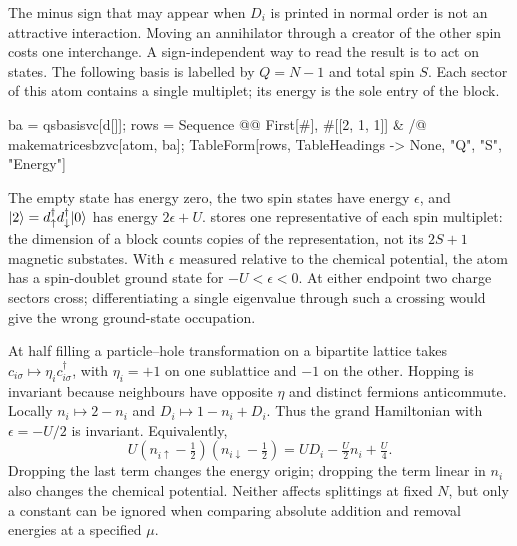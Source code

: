 The minus sign that may appear when $D_i$ is printed in normal order is
not an attractive interaction. Moving an annihilator through a creator
of the other spin costs one interchange. A sign-independent way to read
the result is to act on states. The following basis is labelled by
$Q=N-1$ and total spin $S$. Each sector of this atom contains a single
multiplet; its energy is the sole entry of the block.
\begin{wl}
ba = qsbasisvc[{d[]}];
rows = {Sequence @@ First[#], #[[2, 1, 1]]} & /@ makematricesbzvc[atom, ba];
TableForm[rows, TableHeadings -> {None, {"Q", "S", "Energy"}}]
\end{wl}

The empty state has energy zero, the two spin states have energy
$\epsilon$, and $\lvert 2\rangle=d^\dagger_\uparrow d^\dagger_\downarrow\lvert 0\rangle$
has energy $2\epsilon+U$.  stores one representative of
each spin multiplet: the dimension of a block counts copies of the
representation, not its $2S+1$ magnetic substates.
With $\epsilon$ measured relative to the chemical potential, the atom
has a spin-doublet ground state for $-U<\epsilon<0$. At either
endpoint two charge sectors cross; differentiating a single eigenvalue
through such a crossing would give the wrong ground-state occupation.

At half filling a particle--hole transformation on a bipartite lattice
takes $c_{i\sigma}\mapsto\eta_i c^\dagger_{i\sigma}$, with $\eta_i=+1$
on one sublattice and $-1$ on the other. Hopping is invariant because
neighbours have opposite $\eta$ and distinct fermions anticommute.
Locally $n_i\mapsto2-n_i$ and $D_i\mapsto1-n_i+D_i$. Thus the
grand Hamiltonian with $\epsilon=-U/2$ is invariant. Equivalently,
\[
 U(n_{i\uparrow}-\tfrac12)(n_{i\downarrow}-\tfrac12)
 =U D_i-\tfrac U2 n_i+\tfrac U4 .
\]
Dropping the last term changes the energy origin; dropping the term
linear in $n_i$ also changes the chemical potential. Neither affects
splittings at fixed $N$, but only a constant can be ignored when
comparing absolute addition and removal energies at a specified $\mu$.

